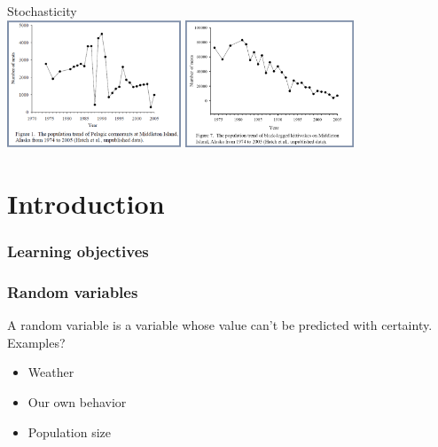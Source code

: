 \documentclass[color=usenames,dvipsnames]{beamer}\usepackage[]{graphicx}\usepackage[]{color}
\begin{document}
\begin{frame}[plain]
  \begin{center}
    {\huge Stochasticity} \\
    \vfill
    \includegraphics[height=3.8cm,keepaspectratio]{figs/pelagic-cormorants} \hspace{0.1cm}
    \includegraphics[height=3.8cm,keepaspectratio]{figs/kittiwakes} %
  \end{center}
\end{frame}




\section{Introduction}


\begin{frame}[plain]
  \frametitle{Learning objectives}
  \tableofcontents%
\end{frame}




\begin{frame}
  \frametitle{Random variables}
  \large
  A random variable is a variable whose value can't be predicted
  with certainty. \\
  \pause
  \vfill
  Examples?
  \begin{itemize}
    \item Weather
    \item Our own behavior
    \item Population size
  \end{itemize}
\end{frame}
\end{document}
